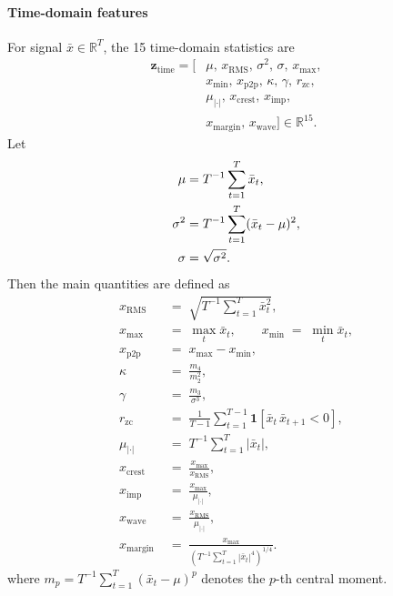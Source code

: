 \documentclass[preprint,12pt,3p]{elsarticle}
\newcommand{\R}{\mathbb{R}}
\begin{document}
\paragraph{Time-domain features}
For signal $\bar{x} \in \R^T$, the 15 time-domain statistics are
\begin{equation}
\begin{aligned}
\mathbf{z}_{\mathrm{time}}
=
\bigl[
&\mu,\,
x_\mathrm{RMS},\,
\sigma^2,\,
\sigma,\,
x_{\max},\\
&x_{\min},\,
x_\mathrm{p2p},\,
\kappa,\,
\gamma,\,
r_\mathrm{zc},\\
&\mu_{|\cdot|},\,
x_\mathrm{crest},\,
x_\mathrm{imp},\\
&x_\mathrm{margin},\,
x_\mathrm{wave}
\bigr]
\in \R^{15}.
\end{aligned}
\end{equation}
Let
\begin{align}
\mu &= T^{-1}\sum_{t=1}^{T}\bar{x}_t, \notag \\
\sigma^2 &= T^{-1}\sum_{t=1}^{T}(\bar{x}_t-\mu)^2, \notag \\
\sigma &= \sqrt{\sigma^2}.
\end{align}
Then the main quantities are defined as
\begin{equation}
\begin{aligned}
x_\mathrm{RMS} \;&=\; \sqrt{T^{-1}\sum_{t=1}^{T}\bar{x}_t^2},\\
x_{\max} \;&=\; \max_t \bar{x}_t,\qquad
x_{\min} \;=\; \min_t \bar{x}_t,\\
x_\mathrm{p2p} \;&=\; x_{\max}-x_{\min},\\
\kappa \;&=\; \frac{m_4}{m_2^2},\\
\gamma \;&=\; \frac{m_3}{\sigma^3},\\
r_\mathrm{zc} \;&=\; \frac{1}{T-1}
  \sum_{t=1}^{T-1}\mathbf{1}\!\left[\bar{x}_t\,\bar{x}_{t+1}<0\right],\\
\mu_{|\cdot|} \;&=\; T^{-1}\sum_{t=1}^{T}|\bar{x}_t|,\\
x_\mathrm{crest} \;&=\; \frac{x_{\max}}{x_\mathrm{RMS}},\\
x_\mathrm{imp} \;&=\; \frac{x_{\max}}{\mu_{|\cdot|}},\\[2pt]
x_\mathrm{wave} \;&=\; \frac{x_\mathrm{RMS}}{\mu_{|\cdot|}},\\
x_\mathrm{margin} \;&=\; \frac{x_{\max}}
{\left(T^{-1}\sum_{t=1}^{T}|\bar{x}_t|^4\right)^{1/4}}.
\end{aligned}
\label{eq:time_features}
\end{equation}
where $m_p = T^{-1}\sum_{t=1}^{T}(\bar{x}_t-\mu)^p$ denotes the
$p$-th central moment.
\end{document}
